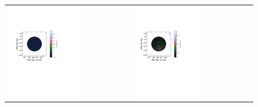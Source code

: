 \begin{figure}
\hspace{-2cm}\begin{tabular}{ll}
\includegraphics[clip, trim=0.1cm 11cm 6cm 6cm, width=0.6\textwidth]{chapters/polcal/figures/68380-I-improved.pdf} &
\includegraphics[clip, trim=0.1cm 11cm 6cm 6cm, width=0.6\textwidth]{chapters/polcal/figures/68380-Q-improved.pdf} \\

\end{tabular}
\end{figure}
